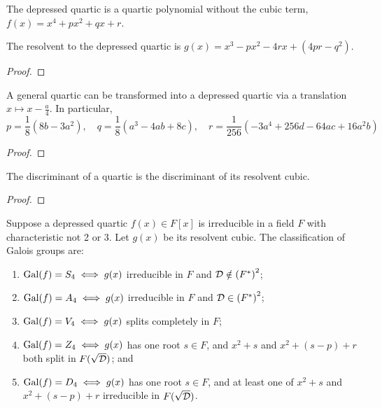 \begin{definition}
    The depressed quartic is a quartic polynomial without the cubic term,
    \(f(x) = x^4 + px^2 + qx + r\).
\end{definition}
\begin{corollary}
    The resolvent to the depressed quartic is
    \(g(x) = x^3 - px^2 - 4rx + (4pr-q^2)\).
\end{corollary}
\begin{proof}
\end{proof}
\begin{lemma}
    A general quartic can be transformed into a depressed quartic
    via a translation \(x \mapsto x-\frac{a}{4}\).
    In particular,
    \begin{equation*}
        p = \frac{1}{8}(8b-3a^2), \quad
        q = \frac{1}{8}(a^3-4ab+8c), \quad
        r = \frac{1}{256}(-3a^4+256d-64ac+16a^2b)
    \end{equation*}
\end{lemma}
\begin{proof}
\end{proof}
\begin{proposition}
    The discriminant of a quartic is the discriminant of its resolvent cubic.
\end{proposition}
\begin{proof}
\end{proof}
\begin{theorem}
    Suppose a depressed quartic \(f(x) \in F[x]\) is irreducible
    in a field \(F\) with characteristic not 2 or 3.
    Let \(g(x)\) be its resolvent cubic.
    The classification of Galois groups are:
    \begin{enumerate}[label={(\alph*)}, itemsep=0mm]
        \item \(\operatorname{Gal}(f) = S_4 \iff g(x)\) irreducible in \(F\) and \(\mathcal{D} \notin {(F^\ast)}^2\);
        \item \(\operatorname{Gal}(f) = A_4 \iff g(x)\) irreducible in \(F\) and \(\mathcal{D} \in {(F^\ast)}^2\);
        \item \(\operatorname{Gal}(f) = V_4 \iff g(x)\) splits completely in \(F\);
        \item \(\operatorname{Gal}(f) = Z_4 \iff g(x)\) has one root \(s \in F\),
            and \(x^2 + s\) and \(x^2 + (s-p) + r\) both split in \(F(\sqrt{\mathcal{D}})\); and
        \item \(\operatorname{Gal}(f) = D_4 \iff g(x)\) has one root \(s \in F\),
            and at least one of \(x^2 + s\) and \(x^2 + (s-p) + r\) irreducible in \(F(\sqrt{\mathcal{D}})\).
    \end{enumerate}
\end{theorem}

